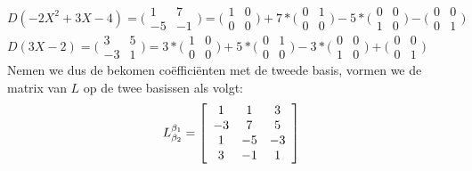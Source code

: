 \documentclass[lineaire_algebra_oplossingen.tex]{subfiles}
\begin{document}
$D(-2X^2+3X-4) = \bigl(
\begin{smallmatrix}
1&7\\ -5&-1
\end{smallmatrix}
\bigr) = \bigl(
\begin{smallmatrix}
1&0\\ 0&0
\end{smallmatrix}
\bigr) + 7* \bigl(
\begin{smallmatrix}
0&1\\ 0&0
\end{smallmatrix}
\bigr) - 5* \bigl(
\begin{smallmatrix}
0&0\\ 1&0
\end{smallmatrix}
\bigr) - \bigl(
\begin{smallmatrix}
0&0\\ 0&1
\end{smallmatrix}
\bigr)$\\

$D(3X-2) = \bigl(
\begin{smallmatrix}
3&5\\ -3&1
\end{smallmatrix}
\bigr) = 3* \bigl(
\begin{smallmatrix}
1&0\\ 0&0
\end{smallmatrix}
\bigr) + 5* \bigl(
\begin{smallmatrix}
0&1\\ 0&0
\end{smallmatrix}
\bigr) - 3* \bigl(
\begin{smallmatrix}
0&0\\ 1&0
\end{smallmatrix}
\bigr) + \bigl(
\begin{smallmatrix}
0&0\\ 0&1
\end{smallmatrix}
\bigr)$\\

Nemen we dus de bekomen co\"effici\"enten met de tweede basis, vormen we de matrix van $L$ op de twee basissen als volgt:\\

\[
L^{\beta_1}_{\beta_2} =
\left[
\begin{array}{c c c}
1 & 1 & 3\\
-3 & 7 & 5\\
1 & -5 & -3\\
3 & -1 & 1
\end{array}
\right]
\]
\end{document}
